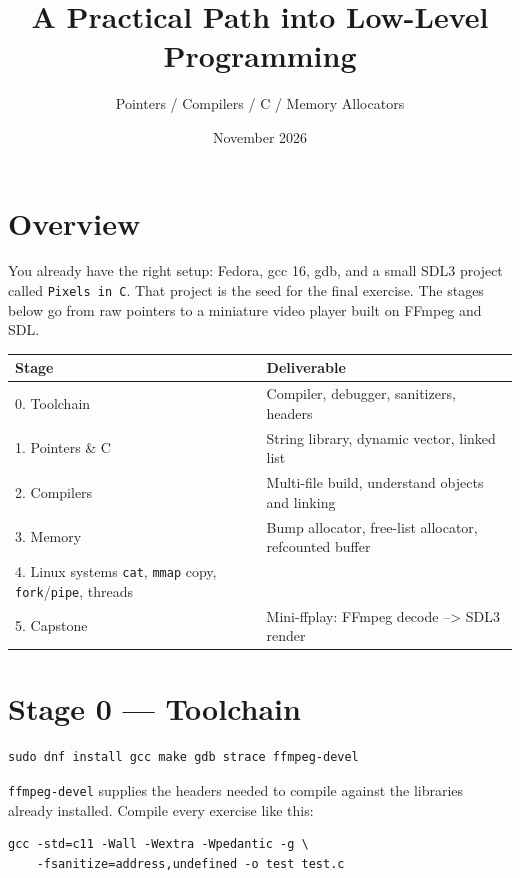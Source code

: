 \documentclass[11pt]{article}
\begin{document}
\title{A Practical Path into Low-Level Programming}
\author{Pointers / Compilers / C / Memory Allocators}
\date{November 2026}
\maketitle

\section*{Overview}

You already have the right setup: Fedora, gcc 16, gdb, and a small SDL3 project
called \texttt{Pixels in C}. That project is the seed for the final exercise.
The stages below go from raw pointers to a miniature video player built on
FFmpeg and SDL.

\bigskip

\begin{center}
\begin{tabular}{@{}p{} p{}@{}}
\hline
\textbf{Stage} & \textbf{Deliverable} \\
\hline
0. Toolchain      & Compiler, debugger, sanitizers, headers \\
1. Pointers \& C  & String library, dynamic vector, linked list \\
2. Compilers      & Multi-file build, understand objects and linking \\
3. Memory         & Bump allocator, free-list allocator, refcounted buffer \\
4. Linux systems  \texttt{cat}, \texttt{mmap} copy, \texttt{fork}/\texttt{pipe}, threads \\
5. Capstone       & Mini-ffplay: FFmpeg decode --> SDL3 render \\
\hline
\end{tabular}
\end{center}

\section{Stage 0 --- Toolchain}

\begin{verbatim}
sudo dnf install gcc make gdb strace ffmpeg-devel
\end{verbatim}

\texttt{ffmpeg-devel} supplies the headers needed to compile against the
libraries already installed. Compile every exercise like this:

\begin{verbatim}
gcc -std=c11 -Wall -Wextra -Wpedantic -g \
    -fsanitize=address,undefined -o test test.c
\end{verbatim}
\end{document}
